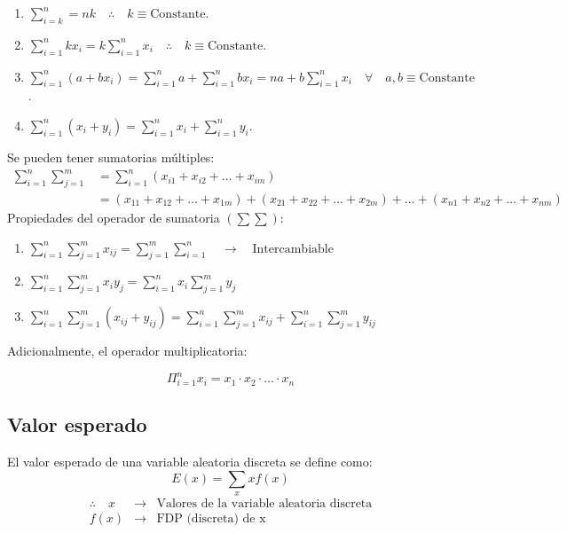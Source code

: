 \documentclass[
]{book}
\providecommand{\tightlist}{%
  \setlength{\itemsep}{0pt}\setlength{\parskip}{0pt}}
\begin{document}
\begin{enumerate}
\def\labelenumi{\arabic{enumi}.}
\tightlist
\item
  \(\sum_{i=k}^n = nk \quad \therefore \quad k \equiv \text{Constante}\).
\item
  \(\sum_{i=1}^n k x_i = k\sum_{i=1}^nx_i \quad \therefore \quad k \equiv \text{Constante}\).
\item
  \(\sum_{i=1}^n (a+bx_i) = \sum_{i=1}^n a + \sum_{i=1}^n bx_i = na + b \sum_{i=1}^n x_i \quad \forall \quad a,b \equiv \text{Constante}\).
\item
  \(\sum_{i=1}^n (x_i + y_i) = \sum_{i=1}^nx_i + \sum_{i=1}^n y_i\).
\end{enumerate}

Se pueden tener sumatorias múltiples:
\[
\begin{aligned}
\sum_{i=1}^n\sum_{j=1}^m &= \sum_{i=1}^n (x_{i1} + x_{i2} + \ldots + x_{im}) \\
&= (x_{11} + x_{12} + \ldots + x_{1m}) + (x_{21} + x_{22} + \ldots + x_{2m})  + \ldots + (x_{n1} + x_{n2} + \ldots + x_{nm})
\end{aligned}
\]
Propiedades del operador de sumatoria \((\sum \sum)\):

\begin{enumerate}
\def\labelenumi{\arabic{enumi}.}
\tightlist
\item
  \(\sum_{i=1}^n\sum_{j=1}^m x_{ij} = \sum_{j=1}^m\sum_{i=1}^n \quad \rightarrow \quad \text{Intercambiable}\)
\item
  \(\sum_{i=1}^n\sum_{j=1}^m x_i y_j = \sum_{i=1}^n x_i \sum_{j=1}^m y_j\)
\item
  \(\sum_{i=1}^n\sum_{j=1}^m (x_{ij} + y_{ij}) = \sum_{i=1}^n\sum_{j=1}^m x_{ij} + \sum_{i=1}^n\sum_{j=1}^m y_{ij}\)
\end{enumerate}

Adicionalmente, el operador multiplicatoria:

\[
\Pi_{i=1}^n x_i = x_1\cdot x_2 \cdot \ldots \cdot x_n
\]

\hypertarget{valor-esperado}{%
\subsection{Valor esperado}\label{valor-esperado}}

El valor esperado de una variable aleatoria discreta se define como:
\[
E(x) = \sum_x xf(x)
\]
\[
\begin{array}{ccc}
\therefore \quad x & \rightarrow & \text{Valores de la variable aleatoria discreta} \\
f(x) & \rightarrow & \text{FDP (discreta) de x}
\end{array}
\]
\end{document}
